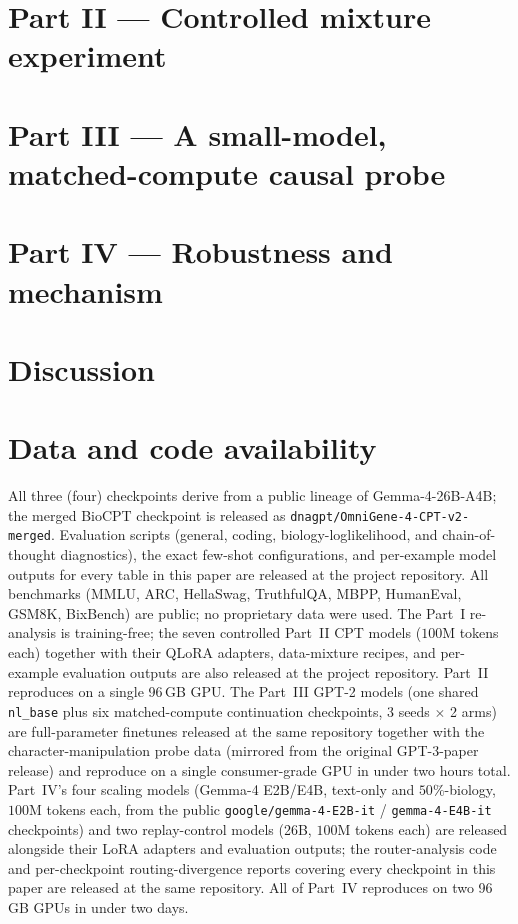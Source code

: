 \documentclass[11pt]{article}
\begin{document}
\section{Part II --- Controlled mixture experiment}
\label{sec:phase2}


\section{Part III --- A small-model, matched-compute causal probe}
\label{sec:phase3}


\section{Part IV --- Robustness and mechanism}
\label{sec:phase4}


\section{Discussion}
\label{sec:discussion}


\section*{Data and code availability}
All three (four) checkpoints derive from a public lineage of Gemma-4-26B-A4B; the merged
BioCPT checkpoint is released as \texttt{dnagpt/OmniGene-4-CPT-v2-merged}. Evaluation scripts
(general, coding, biology-loglikelihood, and chain-of-thought diagnostics), the exact few-shot
configurations, and per-example model outputs for every table in this paper are released at
the project repository. All benchmarks (MMLU, ARC, HellaSwag, TruthfulQA, MBPP, HumanEval,
GSM8K, BixBench) are public; no proprietary data were used. The Part~I re-analysis is
training-free; the seven controlled Part~II CPT models ($100$M tokens each) together with their
QLoRA adapters, data-mixture recipes, and per-example evaluation outputs are also released at
the project repository. Part~II reproduces on a single 96\,GB GPU. The Part~III GPT-2 models
(one shared \texttt{nl\_base} plus six matched-compute continuation checkpoints, $3$ seeds
$\times$ 2 arms) are full-parameter finetunes released at the same repository together with the
character-manipulation probe data (mirrored from the original GPT-3-paper release) and reproduce
on a single consumer-grade GPU in under two hours total. Part~IV's four scaling models (Gemma-4
E2B/E4B, text-only and $50\%$-biology, $100$M tokens each, from the public
\texttt{google/gemma-4-E2B-it} / \texttt{gemma-4-E4B-it} checkpoints) and two replay-control
models (26B, $100$M tokens each) are released alongside their LoRA adapters and evaluation
outputs; the router-analysis code and per-checkpoint routing-divergence reports covering every
checkpoint in this paper are released at the same repository. All of Part~IV reproduces on two
96\,GB GPUs in under two days.
\end{document}
